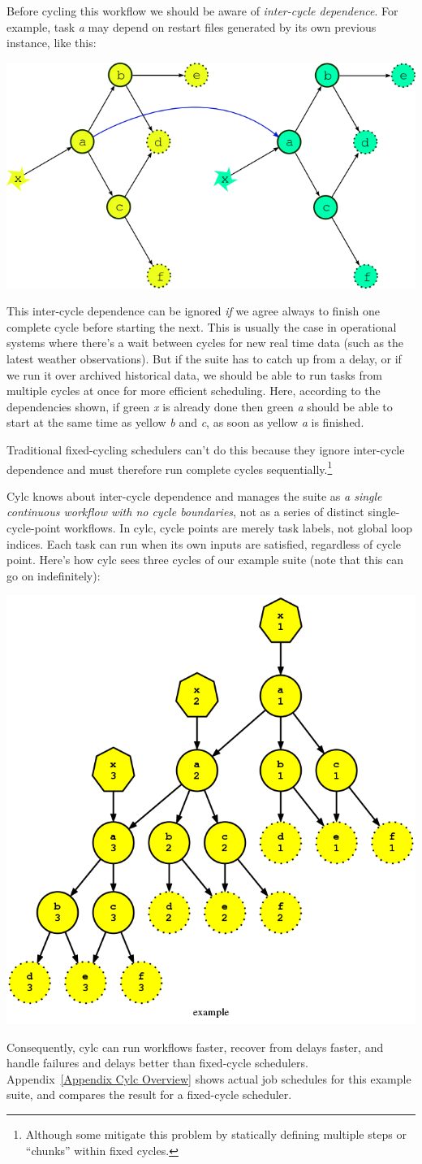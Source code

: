 Before cycling this workflow  we should be aware of {\em inter-cycle
dependence}.  For example, task {\em a} may depend on restart files generated
by its own previous instance, like this:

\begin{center}
    \includegraphics[width=0.5\columnwidth]{resources/tex/dep-two-cycles-linked}
\end{center}

This inter-cycle dependence can be ignored {\em if} we agree always to finish
one complete cycle before starting the next.  This is usually the case in
operational systems where there's a wait between cycles for new real time data
(such as the latest weather observations).  But if the suite has to catch up
from a delay, or if we run it over archived historical data, we should be able
to run tasks from multiple cycles at once for more efficient scheduling.  Here,
according to the dependencies shown, if green {\em x} is already done then
green {\em a} should be able to start at the same time as yellow {\em b}
and {\em c}, as soon as yellow {\em a} is finished.

Traditional fixed-cycling schedulers can't do this because they ignore
inter-cycle dependence and must therefore run complete cycles
sequentially.\footnote{Although some mitigate this problem by statically
defining multiple steps or ``chunks'' within fixed cycles.}

Cylc knows about inter-cycle dependence and manages the suite as {\em a single
continuous workflow with no cycle boundaries}, not as a series of distinct
single-cycle-point workflows.  In cylc, cycle points are merely task labels,
not global loop indices.  Each task can run when its own inputs are satisfied,
regardless of cycle point.  Here's how cylc sees three cycles of our example
suite (note that this can go on indefinitely):

\begin{center}
    \includegraphics[width=0.45\columnwidth]{resources/example-3cycles.png}
\end{center}

Consequently, cylc can run workflows faster, recover from delays faster, and
handle failures and delays better than fixed-cycle schedulers.
Appendix~\ref{Appendix Cylc Overview} shows actual job schedules for this
example suite, and compares the result for a fixed-cycle scheduler.
